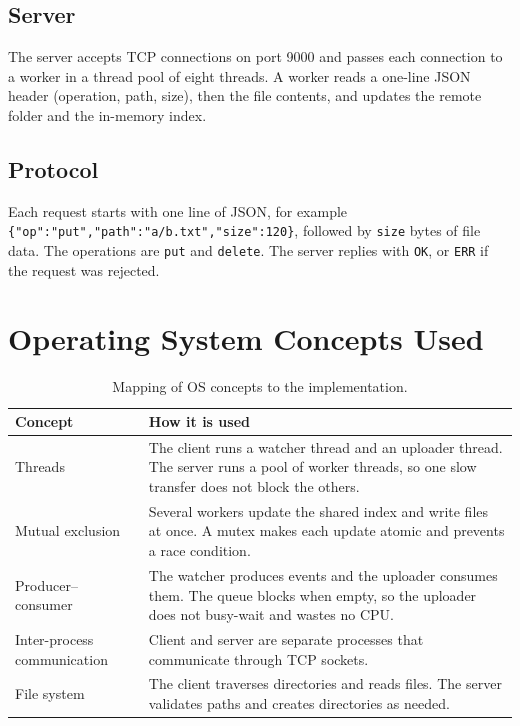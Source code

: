 \documentclass[12pt,a4paper]{article}
\begin{document}
\subsection{Server}
The server accepts TCP connections on port 9000 and passes each connection to a worker in a thread pool of eight threads. A worker reads a one-line JSON header (operation, path, size), then the file contents, and updates the remote folder and the in-memory index.

\subsection{Protocol}
Each request starts with one line of JSON, for example \texttt{\{"op":"put","path":"a/b.txt","size":120\}}, followed by \texttt{size} bytes of file data. The operations are \texttt{put} and \texttt{delete}. The server replies with \texttt{OK}, or \texttt{ERR} if the request was rejected.

\section{Operating System Concepts Used}
\begin{table}[H]
\centering
\begin{tabular}{@{}>{\raggedright\arraybackslash}p{4.4cm}>{\raggedright\arraybackslash}p{10.6cm}@{}}
\toprule
\textbf{Concept} & \textbf{How it is used}\\
\midrule
Threads & The client runs a watcher thread and an uploader thread. The server runs a pool of worker threads, so one slow transfer does not block the others.\\
Mutual exclusion & Several workers update the shared index and write files at once. A mutex makes each update atomic and prevents a race condition.\\
Producer--consumer & The watcher produces events and the uploader consumes them. The queue blocks when empty, so the uploader does not busy-wait and wastes no CPU.\\
Inter-process communication & Client and server are separate processes that communicate through TCP sockets.\\
File system & The client traverses directories and reads files. The server validates paths and creates directories as needed.\\
\bottomrule
\end{tabular}
\caption{Mapping of OS concepts to the implementation.}
\end{table}
\end{document}

